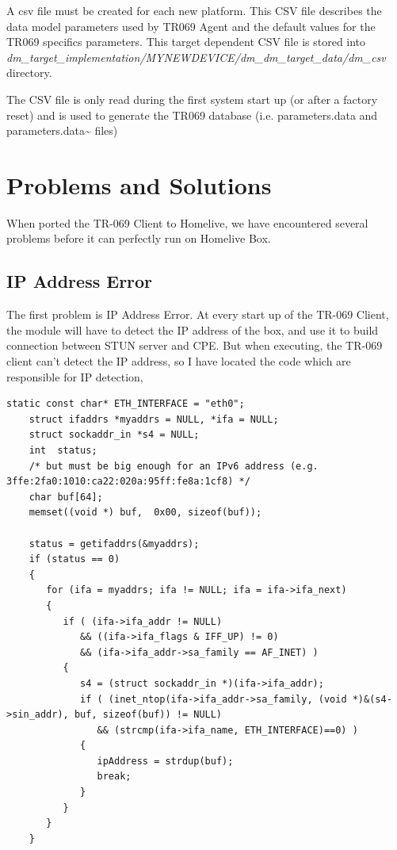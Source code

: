 A csv file must be created for each new platform. This CSV file describes the data model parameters used by TR069 Agent and the default values for the TR069 specifics parameters. This target dependent CSV file is stored into \\\textit{dm\_target\_implementation/MYNEWDEVICE/dm\_dm\_target\_data/dm\_csv} directory.

The CSV file is only read during the first system start up (or after a factory reset) and is used to generate the TR069
database (i.e. parameters.data and parameters.data\~{} files)


\section{Problems and Solutions}

When ported the TR-069 Client to Homelive, we have encountered several problems before it can perfectly run on Homelive Box.


\subsection{IP Address Error}
The first problem is IP Address Error. At every start up of the TR-069 Client, the module will have to detect the IP address of the box, and use it to build connection between STUN server and CPE. But when executing, the TR-069 client can't detect the IP address, so I have located the code which are responsible for IP detection,

\begin{lstlisting}[mathescape]
    static const char* ETH_INTERFACE = "eth0";
    struct ifaddrs *myaddrs = NULL, *ifa = NULL;
    struct sockaddr_in *s4 = NULL;
    int  status;
    /* but must be big enough for an IPv6 address (e.g. 3ffe:2fa0:1010:ca22:020a:95ff:fe8a:1cf8) */
    char buf[64];
    memset((void *) buf,  0x00, sizeof(buf));

    status = getifaddrs(&myaddrs);
    if (status == 0)
    {
       for (ifa = myaddrs; ifa != NULL; ifa = ifa->ifa_next)
       {
          if ( (ifa->ifa_addr != NULL)
             && ((ifa->ifa_flags & IFF_UP) != 0)
             && (ifa->ifa_addr->sa_family == AF_INET) )
          {
             s4 = (struct sockaddr_in *)(ifa->ifa_addr);
             if ( (inet_ntop(ifa->ifa_addr->sa_family, (void *)&(s4->sin_addr), buf, sizeof(buf)) != NULL)
                && (strcmp(ifa->ifa_name, ETH_INTERFACE)==0) )
             {
                ipAddress = strdup(buf);
                break;
             }
          }
       }
    }
\end{lstlisting}

